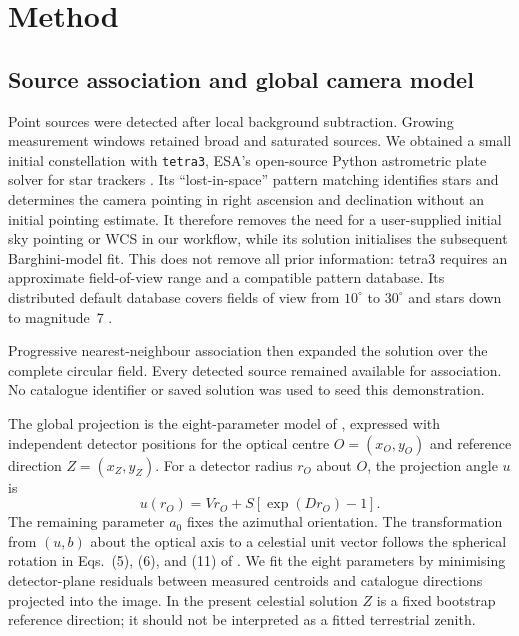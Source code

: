 \documentclass{aa}
\begin{document}
\section{Method}
\label{sec:method}

\subsection{Source association and global camera model}

Point sources were detected after local background subtraction. Growing
measurement windows retained broad and saturated sources. We obtained a small
initial constellation with \texttt{tetra3}, ESA's open-source Python
astrometric plate solver for star trackers \citep{tetra3}. Its
``lost-in-space'' pattern matching identifies stars and determines the camera
pointing in right ascension and declination without an initial pointing
estimate. It therefore removes the need for a user-supplied initial sky
pointing or WCS in our workflow, while its solution initialises the subsequent
Barghini-model fit. This does not remove all prior information: tetra3 requires
an approximate field-of-view range and a compatible pattern database. Its
distributed default database covers fields of view from $10^\circ$ to
$30^\circ$ and stars down to magnitude~7 \citep{tetra3}.

Progressive nearest-neighbour association then expanded the solution over the
complete circular field. Every detected source remained available for
association. No catalogue identifier or saved solution was used to seed this
demonstration.

The global projection is the eight-parameter model of
\citet{Barghini2019}, expressed with independent detector positions for the
optical centre $O=(x_O,y_O)$ and reference direction $Z=(x_Z,y_Z)$. For a
detector radius $r_O$ about $O$, the projection angle $u$ is
\begin{equation}
  u(r_O)=V r_O+S\left[\exp(D r_O)-1\right].
  \label{eq:radial}
\end{equation}
The remaining parameter $a_0$ fixes the azimuthal orientation. The transformation
from $(u,b)$ about the optical axis to a celestial unit vector follows the
spherical rotation in Eqs.~(5), (6), and (11) of \citet{Barghini2019}. We fit
the eight parameters by minimising detector-plane residuals between measured
centroids and catalogue directions projected into the image. In the present
celestial solution $Z$ is a fixed bootstrap reference direction; it should not
be interpreted as a fitted terrestrial zenith.
\end{document}
